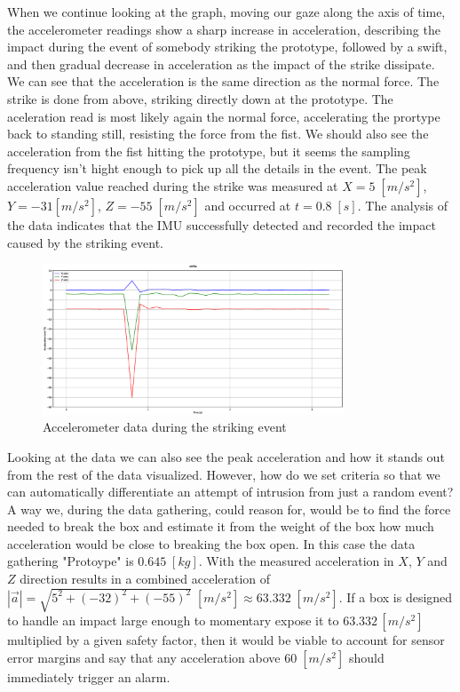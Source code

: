 \documentclass[../main.tex]{subfiles}
\begin{document}
When we continue looking at the graph, moving our gaze along the axis of time, the accelerometer readings show a sharp increase in
acceleration, describing the impact during the event of somebody striking the prototype, followed by a swift, and then gradual decrease in acceleration as
the impact of the strike dissipate.
We can see that the acceleration is the same direction as the normal force.
The strike is done from above, striking directly down at the prototype.
The aceleration read is most likely again the normal force, accelerating the prortype back to standing still, resisting the force from the fist.
We should also see the acceleration from the fist hitting the prototype, but it seems the sampling frequency isn't hight enough to pick up all the details in the event.
The peak acceleration value reached during the
strike was measured at
$X = 5\;[m/s^2]$, $Y = -31 [m/s^2]$, $Z = -55\;[m/s^2]$
and occurred at $t = 0.8\;[s]$.
The analysis of the data indicates that the
IMU successfully detected and recorded the impact caused by the
striking event.

\begin{figure}[htbp]
    \centering
    \includegraphics[width=0.8\textwidth]
    {resources/figures/Acceleration_strike.eps}
    \caption{Accelerometer data during the striking event}
    \label{fig:accelerometer_striking}
\end{figure}

Looking at the data we can also see the peak acceleration and how it
stands out from the rest of the data visualized.
However, how do we set criteria so that we can automatically differentiate an attempt of intrusion from just a random event?
A way we, during the data gathering, could reason for, would be to find the force needed to break the box and estimate it from the weight of the box how much acceleration would be close to breaking the box open. In this case the data gathering "Protoype" is $0.645\;[kg]$. With the measured acceleration in $X$, $Y$ and $Z$ direction results in a combined acceleration of $|\overrightarrow{a}| = \sqrt{5^2+(-32)^2+(-55)^2}\;[m/s^2] \approx 63.332\;[m/s^2]$. If a box is designed to handle an impact large enough to momentary expose it to $63.332\,[m/s^2]$ multiplied by a given safety factor, then it would be viable to account for sensor error margins and say that any acceleration above $60\;[m/s^2]$ should immediately trigger an alarm.
\end{document}
